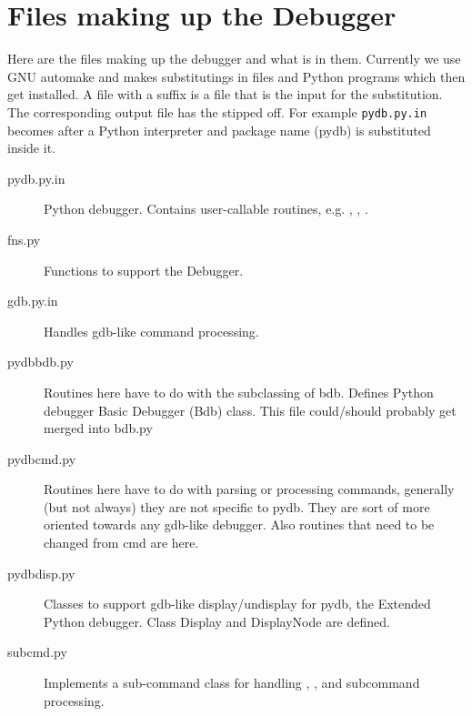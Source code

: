 \section{Files making up the Debugger \label{debugger-files}}

Here are the files making up the debugger and what is in
them. Currently we use GNU automake and makes substitutings in files
and Python programs which then get installed. A file with a 
suffix is a file that is the input for the substitution. The
corresponding output file has the  stipped off. For example
{\tt pydb.py.in} becomes  after a Python interpreter and
package name (pydb) is substituted inside it.

\begin{description}
  
\item[pydb.py.in]
Python debugger. Contains user-callable routines, e.g. 
, , .

\item[fns.py]

Functions to support the Debugger.

\item[gdb.py.in]

Handles gdb-like command processing.

\item[pydbbdb.py]

Routines here have to do with the subclassing of bdb.  Defines Python
debugger Basic Debugger (Bdb) class.  This file could/should probably
get merged into bdb.py

\item[pydbcmd.py]

Routines here have to do with parsing or processing commands,
generally (but not always) they are not specific to pydb. They are sort
of more oriented towards any gdb-like debugger. Also routines that need to
be changed from cmd are here.

\item[pydbdisp.py]

Classes to support gdb-like display/undisplay for pydb, the Extended
Python debugger. Class Display and DisplayNode are defined.

\item[subcmd.py]

Implements a sub-command class for handling , ,
and  subcommand processing.

\end{description}


